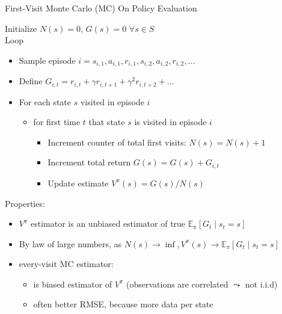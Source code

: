 \documentclass[aspectratio=169]{../latex_main/tntbeamer}  %
\begin{document}
\begin{frame}[c]{First-Visit Monte Carlo (MC) On Policy Evaluation}

Initialize $N(s) = 0$, $G(s) = 0$ $\forall s \in S$\\
Loop 
\begin{itemize}
	\item Sample episode $i = s_{i,1}, a_{i,1}, r_{i,1}, s_{i,2}, a_{i,2}, r_{i,2}, \ldots$
	\item Define $G_{i,t} = r_{i,t} + \gamma r_{i,t+1} + \gamma^2 r_{i,t+2} + \ldots$
	\item For each state $s$ visited in episode $i$
	\begin{itemize}
		\item for first time $t$ that state $s$ is visited in episode $i$
		\begin{itemize}
			\item Increment counter of total first visits: $N(s) = N(s) + 1$
			\item Increment total return $G(s) = G(s) + G_{i,t}$
			\item Update estimate $V^\pi (s) = G(s) /N(s)$
		\end{itemize}
	\end{itemize}
\end{itemize}

Properties:
\begin{itemize}
	\item $V^\pi$ estimator is an unbiased estimator of true $\mathbb{E}_\pi [G_t \mid s_t = s]$
	\item By law of large numbers, as $N(s) \to \inf, V^\pi(s) \to \mathbb{E}_\pi [G_t \mid s_t = s]$
	\item \alert{every}-visit MC estimator:
	\begin{itemize}
		\item is biased estimator of $V^\pi$ (observations are correlated $\leadsto$ not i.i.d)
		\item often better RMSE, because more data per state
	\end{itemize}

\end{itemize}

\end{frame}
\end{document}
